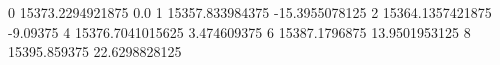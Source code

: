0 15373.2294921875 0.0
1 15357.833984375 -15.3955078125
2 15364.1357421875 -9.09375
4 15376.7041015625 3.474609375
6 15387.1796875 13.9501953125
8 15395.859375 22.6298828125
